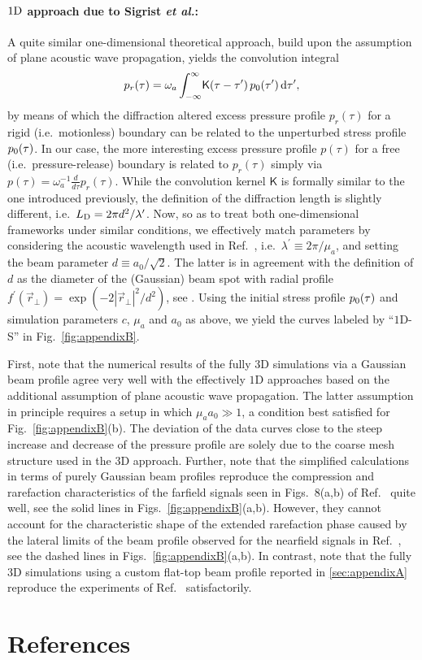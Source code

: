 \documentclass[12pt]{iopart}
\begin{document}
\paragraph{$1{\rm{D}}$ approach due to Sigrist {\emph{et al.}}:}
A quite similar one-dimensional theoretical approach, build upon the assumption
of plane acoustic wave propagation, yields the convolution integral
\cite{Sigrist:1986,Terzic:1984}
\begin{equation}
p_r(\tau) = \omega_a \int_{-\infty}^{\infty}
        \!\mathsf{K}(\tau-\tau^\prime)\,p_{\rm 0}(\tau^\prime)
        \,\mathrm{d}\tau^\prime,
        \label{eq:OAV1}
\end{equation}
by means of which the diffraction altered 
excess pressure profile $p_r(\tau)$ for a rigid (i.e.\
motionless) boundary can be related to the unperturbed stress profile 
$p_{\rm 0}(\tau)$.
In our case, the more interesting excess pressure profile $p(\tau)$ for a free
(i.e.\ pressure-release) boundary is related to $p_r(\tau)$ simply via
$p(\tau) = \omega_a^{-1} \frac{d}{d\tau}p_r(\tau)$.
While the convolution kernel ${\mathsf{K}}$ is formally similar to the one
introduced previously, the definition of the diffraction length is slightly
different, i.e.\ $L_{\rm D} = 2 \pi d^2/\lambda^\prime$. Now, so as to treat
both one-dimensional frameworks under similar conditions, we effectively match
parameters by considering the acoustic wavelength used in Ref.\
\cite{Karabutov:1996}, i.e.\ $\lambda^\prime\equiv 2 \pi/ \mu_a$, and setting
the beam parameter $d\equiv a_0/\sqrt{2}$. The latter is in agreement with the
definition of $d$ as the diameter of the (Gaussian) beam spot with radial
profile $f^\prime(\vec{r}_{\perp}) = \exp(-2 |\vec{r}_{\perp}|^2/d^2)$, see
\cite{Sigrist:1986}.  Using the initial stress profile $p_{\rm 0}(\tau)$ and
simulation parameters $c$, $\mu_a$ and $a_0$ as above, we yield the curves
labeled by ``$1$D-S'' in Fig.\ \ref{fig:appendixB}.

First, note that the numerical results of the fully $3$D simulations via a
Gaussian beam profile agree very well with the effectively $1$D approaches
based on the additional assumption of plane acoustic wave propagation.  The
latter assumption in principle requires a setup in which $\mu_a a_0 \gg 1$, a
condition best satisfied for Fig.\ \ref{fig:appendixB}(b). The deviation of 
the data curves close to the steep increase and decrease of the pressure 
profile are solely due to the coarse mesh structure used in the $3$D approach.
Further, note that the simplified calculations in terms of purely Gaussian beam
profiles reproduce the compression and rarefaction characteristics of the
farfield signals seen in Figs.\ 8(a,b) of Ref.\ \cite{Paltauf:2000} quite well,
see the solid lines in Figs.\ \ref{fig:appendixB}(a,b). However, they cannot
account for the characteristic shape of the extended rarefaction phase caused
by the lateral limits of the beam profile observed for the nearfield
signals in Ref.\ \cite{Paltauf:2000}, see the dashed lines in
Figs.\ \ref{fig:appendixB}(a,b).
In contrast, note that the fully $3$D simulations using a custom flat-top
beam profile reported in \ref{sec:appendixA} reproduce the experiments 
of Ref.\ \cite{Paltauf:2000} satisfactorily.

\section*{References}

\end{document}
